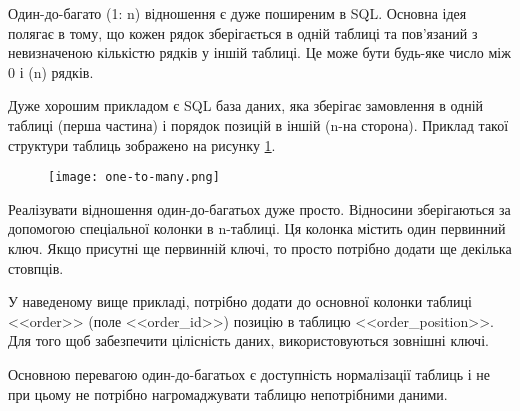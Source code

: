 \par Один-до-багато (1: n) відношення є дуже поширеним в SQL. Основна ідея полягає в тому, що кожен рядок зберігається в одній таблиці та пов'язаний з невизначеною кількістю рядків у іншій таблиці. Це може бути будь-яке число між 0 і (n) рядків.
\par Дуже хорошим прикладом є SQL база даних, яка зберігає замовлення в одній таблиці (перша частина) і порядок позицій в іншій (n-на сторона). Приклад такої структури таблиць зображено на рисунку \ref{pic:one_to_many.png}.
\begin{figure}[!ht]
\centering
		\texttt{[image: one-to-many.png]}
		\label{pic:one_to_many.png}
\end{figure}
\par Реалізувати відношення один-до-багатьох дуже просто. Відносини зберігаються за допомогою спеціальної колонки в n-таблиці. Ця колонка містить один первинний ключ. Якщо присутні ще первинній ключі, то просто потрібно додати ще декілька стовпців.

\par У наведеному вище прикладі, потрібно додати до основної колонки таблиці <<order>> (поле <<order\_id>>) позицію в таблицю <<order\_position>>. Для того щоб забезпечити цілісність даних, використовуються зовнішні ключі.
\par Основною перевагою один-до-багатьох є доступність нормалізації таблиць і не при цьому не потрібно нагромаджувати таблицю непотрібними даними.


